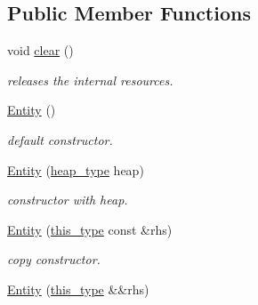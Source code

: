 \subsection*{Public Member Functions}
\begin{DoxyCompactItemize}
\item 
\hypertarget{classhryky_1_1uri_1_1authority_1_1_entity_ad172fb60d5204356d1b03f203333395d}{void \hyperlink{classhryky_1_1uri_1_1authority_1_1_entity_ad172fb60d5204356d1b03f203333395d}{clear} ()}\label{classhryky_1_1uri_1_1authority_1_1_entity_ad172fb60d5204356d1b03f203333395d}

\begin{DoxyCompactList}\small\item\em releases the internal resources. \end{DoxyCompactList}\item 
\hypertarget{classhryky_1_1uri_1_1authority_1_1_entity_acb6c6b5aaf4d64a0a9bd72fdb4ce6f01}{\hyperlink{classhryky_1_1uri_1_1authority_1_1_entity_acb6c6b5aaf4d64a0a9bd72fdb4ce6f01}{Entity} ()}\label{classhryky_1_1uri_1_1authority_1_1_entity_acb6c6b5aaf4d64a0a9bd72fdb4ce6f01}

\begin{DoxyCompactList}\small\item\em default constructor. \end{DoxyCompactList}\item 
\hyperlink{classhryky_1_1uri_1_1authority_1_1_entity_ad68c092e1c13d4631d5068a976d76072}{Entity} (\hyperlink{classhryky_1_1memory_1_1heap_1_1_base}{heap\-\_\-type} heap)
\begin{DoxyCompactList}\small\item\em constructor with heap. \end{DoxyCompactList}\item 
\hypertarget{classhryky_1_1uri_1_1authority_1_1_entity_a67713eb5a780fc9c897a3dc4ef19f0f4}{\hyperlink{classhryky_1_1uri_1_1authority_1_1_entity_a67713eb5a780fc9c897a3dc4ef19f0f4}{Entity} (\hyperlink{classhryky_1_1uri_1_1authority_1_1_entity_a72978dd715c7bda0b5b1015967ecc5fe}{this\-\_\-type} const \&rhs)}\label{classhryky_1_1uri_1_1authority_1_1_entity_a67713eb5a780fc9c897a3dc4ef19f0f4}

\begin{DoxyCompactList}\small\item\em copy constructor. \end{DoxyCompactList}\item 
\hypertarget{classhryky_1_1uri_1_1authority_1_1_entity_a4c74b86cb3f197757d761b0b026180d4}{\hyperlink{classhryky_1_1uri_1_1authority_1_1_entity_a4c74b86cb3f197757d761b0b026180d4}{Entity} (\hyperlink{classhryky_1_1uri_1_1authority_1_1_entity_a72978dd715c7bda0b5b1015967ecc5fe}{this\-\_\-type} \&\&rhs)}\label{classhryky_1_1uri_1_1authority_1_1_entity_a4c74b86cb3f197757d761b0b026180d4}


\end{DoxyCompactItemize}
